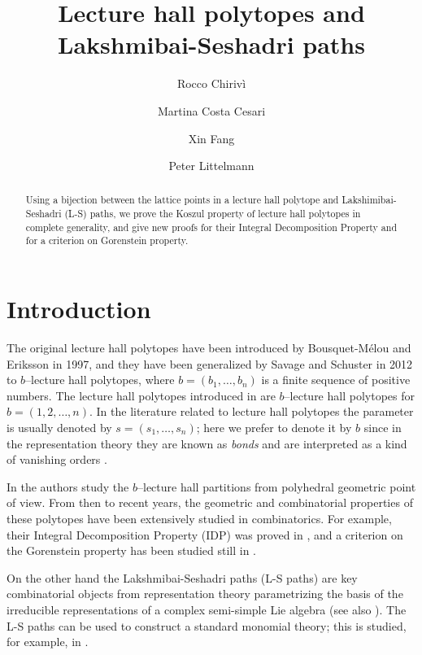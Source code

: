 \documentclass[12pt, a4paper]{amsart}   	%
\title[Lecture hall polytopes and Lakshmibai-Seshadri paths]{Lecture hall polytopes and\\Lakshmibai-Seshadri paths}
\author{Rocco Chiriv\`i}
\author{Martina Costa Cesari}
\author{Xin Fang}
\author{Peter Littelmann}
\numberwithin{equation}{section}
\theoremstyle{plain}
\theoremstyle{definition}
\begin{document}
\begin{abstract} Using a bijection between the lattice points in a lecture hall polytope and Lakshimibai-Seshadri (L-S) paths, we prove the Koszul property of lecture hall polytopes in complete generality, and give new proofs for their Integral Decomposition Property and for a criterion on Gorenstein property.
\end{abstract}

\maketitle


\section{Introduction}

The original lecture hall polytopes have been introduced by Bousquet-Mélou and Eriksson \cite{BousquetEriksson} in 1997, and they have been generalized by Savage and Schuster \cite{SS} in 2012 to $b$--lecture hall polytopes, where $b = (b_1, \ldots, b_n)$ is a finite sequence of positive numbers. The lecture hall polytopes introduced in \cite{BousquetEriksson} are $b$--lecture hall polytopes for $b=(1,2,\ldots,n)$. In the literature related to lecture hall polytopes the parameter is usually denoted by $s = (s_1, \ldots,s_n)$; here we prefer to denote it by $b$ since in the representation theory they are known as \emph{bonds} and are interpreted as a kind of vanishing orders \cite{CFL1,CFL3,CFL4}.

In \cite{SS} the authors study the $b$--lecture hall partitions from polyhedral geometric point of view. From then to recent years, the geometric and combinatorial properties of these polytopes have been extensively studied in combinatorics. For example, their Integral Decomposition Property (IDP) was proved in \cite{HibiOlsenTsuchiya, BrandenSolus}, and a criterion on the Gorenstein property has been studied still in \cite{HibiOlsenTsuchiya}.

On the other hand the Lakshmibai-Seshadri paths (L-S paths) \cite{LittelmannPaths2, LittelmannPaths} are key combinatorial objects from representation theory parametrizing the basis of the irreducible representations of a complex semi-simple Lie algebra (see also \cite{LittelmannPaths3,CFL0,CFL1,CFL3,CFL4}). The L-S paths can be used to construct a standard monomial theory; this is studied, for example, in \cite{Chirivi, LLM}.
\end{document}
